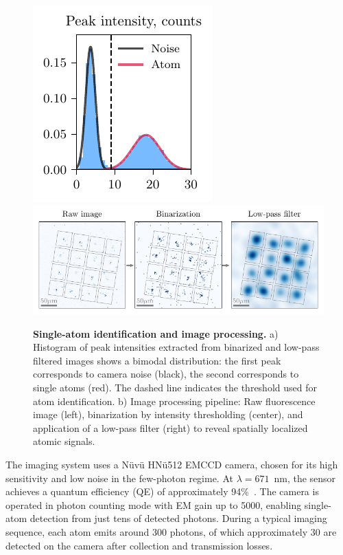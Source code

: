 

\begin{figure}
    \centering
    \includegraphics{fig-py/imaging-hist.pdf}
    \hfill
    \includegraphics{fig-py/imaging-base.pdf}
    \caption[Single-atom identification and image processing]{
        \textbf{Single-atom identification and image processing.}
        a) Histogram of peak intensities extracted from binarized and low-pass filtered images shows a bimodal distribution: the first peak corresponds to camera noise (black), the second corresponds to single atoms (red). The dashed line indicates the threshold used for atom identification.
        b) Image processing pipeline: Raw fluorescence image (left), binarization by intensity thresholding (center), and application of a low-pass filter (right) to reveal spatially localized atomic signals. 
    }
    \label{fig:imaging}
\end{figure}

The imaging system uses a Nüvü HNü512 EMCCD camera, chosen for its high sensitivity and low noise in the few-photon regime. At $\lambda = 671$~nm, the sensor achieves a quantum efficiency (QE) of approximately 94\%~\cite{kruip_design_2024}. The camera is operated in photon counting mode with EM gain up to 5000, enabling single-atom detection from just tens of detected photons. During a typical imaging sequence, each atom emits around 300 photons, of which approximately 30 are detected on the camera after collection and transmission losses.

